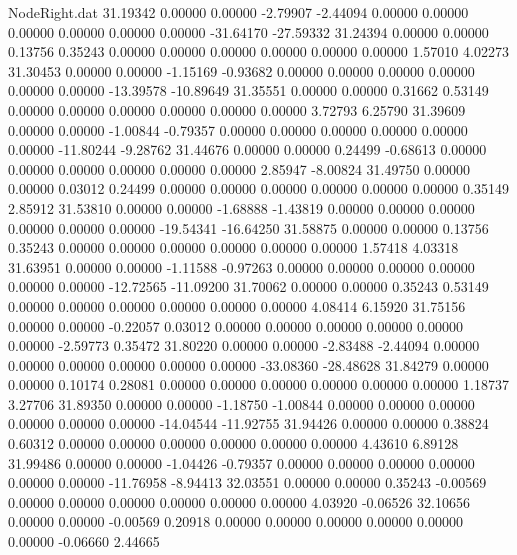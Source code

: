 \begin{filecontents}{NodeRight.dat}
  31.19342    0.00000    0.00000    -2.79907   -2.44094    0.00000    0.00000    0.00000    0.00000    0.00000    0.00000  -31.64170  -27.59332
  31.24394    0.00000    0.00000     0.13756    0.35243    0.00000    0.00000    0.00000    0.00000    0.00000    0.00000    1.57010    4.02273
  31.30453    0.00000    0.00000    -1.15169   -0.93682    0.00000    0.00000    0.00000    0.00000    0.00000    0.00000  -13.39578  -10.89649
  31.35551    0.00000    0.00000     0.31662    0.53149    0.00000    0.00000    0.00000    0.00000    0.00000    0.00000    3.72793    6.25790
  31.39609    0.00000    0.00000    -1.00844   -0.79357    0.00000    0.00000    0.00000    0.00000    0.00000    0.00000  -11.80244   -9.28762
  31.44676    0.00000    0.00000     0.24499   -0.68613    0.00000    0.00000    0.00000    0.00000    0.00000    0.00000    2.85947   -8.00824
  31.49750    0.00000    0.00000     0.03012    0.24499    0.00000    0.00000    0.00000    0.00000    0.00000    0.00000    0.35149    2.85912
  31.53810    0.00000    0.00000    -1.68888   -1.43819    0.00000    0.00000    0.00000    0.00000    0.00000    0.00000  -19.54341  -16.64250
  31.58875    0.00000    0.00000     0.13756    0.35243    0.00000    0.00000    0.00000    0.00000    0.00000    0.00000    1.57418    4.03318
  31.63951    0.00000    0.00000    -1.11588   -0.97263    0.00000    0.00000    0.00000    0.00000    0.00000    0.00000  -12.72565  -11.09200
  31.70062    0.00000    0.00000     0.35243    0.53149    0.00000    0.00000    0.00000    0.00000    0.00000    0.00000    4.08414    6.15920
  31.75156    0.00000    0.00000    -0.22057    0.03012    0.00000    0.00000    0.00000    0.00000    0.00000    0.00000   -2.59773    0.35472
  31.80220    0.00000    0.00000    -2.83488   -2.44094    0.00000    0.00000    0.00000    0.00000    0.00000    0.00000  -33.08360  -28.48628
  31.84279    0.00000    0.00000     0.10174    0.28081    0.00000    0.00000    0.00000    0.00000    0.00000    0.00000    1.18737    3.27706
  31.89350    0.00000    0.00000    -1.18750   -1.00844    0.00000    0.00000    0.00000    0.00000    0.00000    0.00000  -14.04544  -11.92755
  31.94426    0.00000    0.00000     0.38824    0.60312    0.00000    0.00000    0.00000    0.00000    0.00000    0.00000    4.43610    6.89128
  31.99486    0.00000    0.00000    -1.04426   -0.79357    0.00000    0.00000    0.00000    0.00000    0.00000    0.00000  -11.76958   -8.94413
  32.03551    0.00000    0.00000     0.35243   -0.00569    0.00000    0.00000    0.00000    0.00000    0.00000    0.00000    4.03920   -0.06526
  32.10656    0.00000    0.00000    -0.00569    0.20918    0.00000    0.00000    0.00000    0.00000    0.00000    0.00000   -0.06660    2.44665

\end{filecontents}
